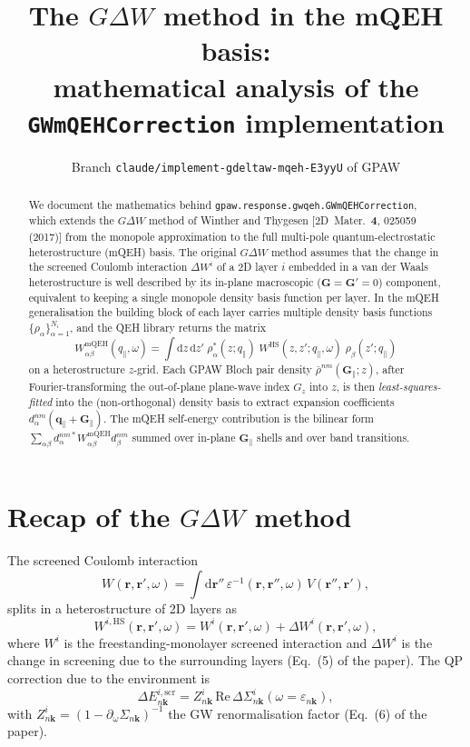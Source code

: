 \documentclass[11pt,a4paper]{article}
\title{The $G\Delta W$ method in the mQEH basis: \\ mathematical analysis of the \texttt{GWmQEHCorrection} implementation}
\author{Branch \texttt{claude/implement-gdeltaw-mqeh-E3yyU} of GPAW}
\date{}
\newcommand{\rr}{\mathbf{r}}
\newcommand{\GG}{\mathbf{G}}
\newcommand{\kk}{\mathbf{k}}
\newcommand{\Gpar}{\mathbf{G}_{\!\parallel}}
\newcommand{\qpar}{\mathbf{q}_{\parallel}}
\newcommand{\Gz}{G_{z}}
\newcommand{\dd}{\mathrm{d}}
\newcommand{\Heter}{\text{HS}}
\newcommand{\eps}{\varepsilon}
\begin{document}
\maketitle

\begin{abstract}
We document the mathematics behind \texttt{gpaw.response.gwqeh.GWmQEHCorrection},
which extends the $G\Delta W$ method of Winther and
Thygesen [2D~Mater.~\textbf{4}, 025059 (2017)] from the monopole approximation
to the full multi-pole quantum-electrostatic heterostructure (mQEH)
basis.  The original $G\Delta W$ method assumes that the change in the
screened Coulomb interaction $\Delta W^i$ of a 2D layer $i$ embedded
in a van der Waals heterostructure is well described by its in-plane
macroscopic ($\GG=\GG'=0$) component, equivalent to keeping a single
monopole density basis function per layer.  In the mQEH generalisation
the building block of each layer carries multiple density basis
functions $\{\rho_{\alpha}\}_{\alpha=1}^{N_i}$, and the QEH library
returns the matrix
\[
W^{\text{mQEH}}_{\alpha\beta}(q_\parallel,\omega) =
\int\!\dd z\,\dd z'\;\rho_{\alpha}^{*}(z;q_\parallel)\;
W^{\Heter}(z,z';q_\parallel,\omega)\;\rho_{\beta}(z';q_\parallel)
\]
on a heterostructure $z$-grid.  Each GPAW Bloch pair density
$\bar\rho^{nm}(\Gpar;z)$, after Fourier-transforming the out-of-plane
plane-wave index $\Gz$ into $z$, is then \emph{least-squares-fitted}
into the (non-orthogonal) density basis to extract expansion
coefficients $d^{nm}_{\alpha}(\qpar+\Gpar)$.  The mQEH self-energy
contribution is the bilinear form
$\sum_{\alpha\beta} d^{nm*}_{\alpha} W^{\text{mQEH}}_{\alpha\beta}
d^{nm}_{\beta}$ summed over in-plane $\Gpar$ shells and over band
transitions.
\end{abstract}

\section{Recap of the $G\Delta W$ method}

The screened Coulomb interaction
\begin{equation}
W(\rr,\rr',\omega) = \int \dd\rr''\, \eps^{-1}(\rr,\rr'',\omega)\,
   V(\rr'',\rr'),
\label{eq:W-def}
\end{equation}
splits in a heterostructure of 2D layers as
\begin{equation}
W^{i,\Heter}(\rr,\rr',\omega) =
   W^i(\rr,\rr',\omega) + \Delta W^i(\rr,\rr',\omega),
\label{eq:dW-decomp}
\end{equation}
where $W^i$ is the freestanding-monolayer screened interaction and
$\Delta W^i$ is the change in screening due to the surrounding layers
(Eq.~(5) of the paper).  The QP correction due to the environment is
\begin{equation}
\Delta E_{n\kk}^{i,\text{scr}} = Z_{n\kk}^i\,
   \mathrm{Re}\,\Delta\Sigma_{n\kk}^i(\omega=\eps_{n\kk}),
\label{eq:dE-Z-dSigma}
\end{equation}
with $Z_{n\kk}^i = (1 - \partial_\omega\Sigma_{n\kk})^{-1}$ the GW
renormalisation factor (Eq.~(6) of the paper).
\end{document}
